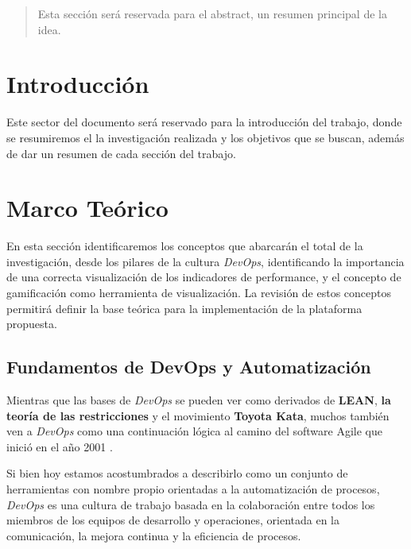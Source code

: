 \documentclass[journal]{IEEEtran}
\begin{document}
\begin{abstract}
    Esta sección será reservada para el abstract, un resumen principal de la idea.
\end{abstract}

\section{\textbf{\Large Introducción}}
Este sector del documento será reservado para la introducción del trabajo, donde se resumiremos el la investigación realizada y los objetivos que se buscan, además de dar un resumen de cada sección del trabajo.

\section{\textbf{\Large Marco Teórico}}

En esta sección identificaremos los conceptos que abarcarán el total de la investigación, desde los pilares de la cultura \textit{DevOps}, identificando la importancia de una correcta visualización de los indicadores de performance, y el concepto de gamificación como herramienta de visualización. La revisión de estos conceptos permitirá definir la base teórica para la implementación de la plataforma propuesta.

\subsection{\textbf{Fundamentos de DevOps y Automatización}} \label{fundamentos-devops}

\begin{tcolorbox}[colback=gray!10, colframe=black, left=2mm, right=2mm]
    \small %
    \ttfamily %
    \raggedright %
    Mientras que las bases de \textit{DevOps} se pueden ver como derivados de \textbf{LEAN}, \textbf{la teoría de las restricciones} y el movimiento \textbf{Toyota Kata}, muchos también ven a \textit{DevOps} como una continuación lógica al camino del software Agile que inició en el año 2001 \cite{kim2021devops}.
\end{tcolorbox}

Si bien hoy estamos acostumbrados a describirlo como un conjunto de herramientas con nombre propio orientadas a la automatización de procesos, \textit{DevOps} es una cultura de trabajo basada en la colaboración entre todos los miembros de los equipos de desarrollo y operaciones, orientada en la comunicación, la mejora continua y la eficiencia de procesos.
\end{document}
